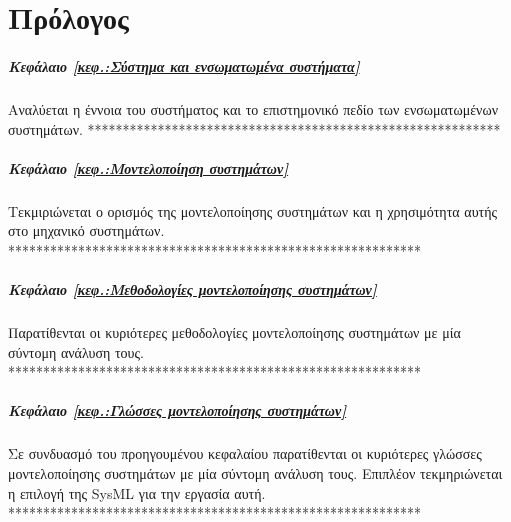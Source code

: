 \documentclass[a4paper,12pt,twoside]{report}
\begin{document}
\pagestyle{fancy}
\fancyhf{}
\renewcommand{\chaptermark}[1]{\markboth{ \emph{#1}}{}}

\fancyhead[RE]{\leftmark}
\fancyfoot[LE,RO]{\thepage}



	\newpage
	\chapter*{Πρόλογος}
		
		\paragraph{Κεφάλαιο \ref{κεφ.:Σύστημα και ενσωματωμένα συστήματα}} {Αναλύεται η έννοια του συστήματος και το επιστημονικό πεδίο των ενσωματωμένων συστημάτων.
		***********************************************************
		}
		\paragraph{Κεφάλαιο \ref{κεφ.:Μοντελοποίηση συστημάτων}} { Τεκμιριώνεται ο ορισμός της μοντελοποίησης συστημάτων και η χρησιμότητα αυτής στο μηχανικό συστημάτων.
		***********************************************************
		}
		\paragraph{Κεφάλαιο \ref{κεφ.:Μεθοδολογίες μοντελοποίησης συστημάτων}} {Παρατίθενται οι κυριότερες μεθοδολογίες μοντελοποίησης συστημάτων με μία σύντομη ανάλυση τους.
		***********************************************************
		}
		\paragraph{Κεφάλαιο \ref{κεφ.:Γλώσσες μοντελοποίησης συστημάτων}} {Σε συνδυασμό του προηγουμένου κεφαλαίου παρατίθενται οι κυριότερες γλώσσες  μοντελοποίησης συστημάτων με μία σύντομη ανάλυση τους. Επιπλέον τεκμηριώνεται η επιλογή της SysML για την εργασία αυτή.
		***********************************************************
		}
\end{document}
